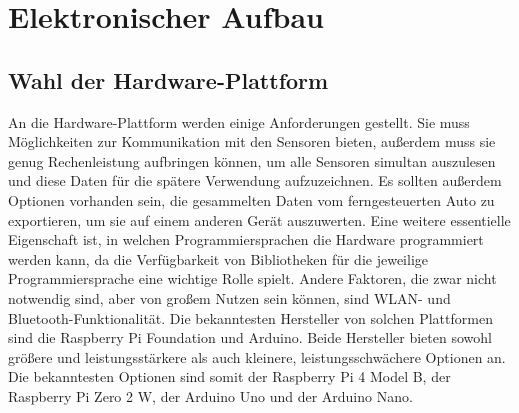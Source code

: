 \section{Elektronischer Aufbau}
\label{sec:Elektronik}

\subsection{Wahl der Hardware-Plattform}
\label{subsec:elekMikrocontroller}
An die Hardware-Plattform werden einige Anforderungen gestellt. Sie muss Möglichkeiten zur Kommunikation mit den Sensoren bieten, außerdem muss sie genug Rechenleistung aufbringen können, um alle Sensoren simultan auszulesen und diese Daten für die spätere Verwendung aufzuzeichnen. Es sollten außerdem Optionen vorhanden sein, die gesammelten Daten vom ferngesteuerten Auto zu exportieren, um sie auf einem anderen Gerät auszuwerten. Eine weitere essentielle Eigenschaft ist, in welchen Programmiersprachen die Hardware programmiert werden kann, da die Verfügbarkeit von Bibliotheken für die jeweilige Programmiersprache eine wichtige Rolle spielt. Andere Faktoren, die zwar nicht notwendig sind, aber von großem Nutzen sein können, sind \ac{WLAN}- und Bluetooth-Funktionalität. Die bekanntesten Hersteller von solchen Plattformen sind die Raspberry Pi Foundation und Arduino.  Beide Hersteller bieten sowohl größere und leistungsstärkere als auch kleinere, leistungsschwächere Optionen an. Die bekanntesten Optionen sind somit der Raspberry Pi 4 Model B, der Raspberry Pi Zero 2 W, der Arduino Uno und der Arduino Nano. 
